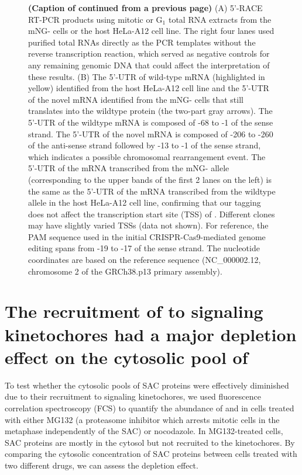 \begin{figure}
    \noindent\justifying \textbf{(Caption of  continued from a previous page)} (A) 5'-RACE RT-PCR products using mitotic or G$_1$ total RNA extracts from  the mNG- cells or the host HeLa-A12 cell line. The right four lanes used purified total RNAs directly as the PCR templates without the reverse transcription reaction, which served as negative controls for any remaining genomic DNA that could affect the interpretation of these results. (B) The 5'-UTR of wild-type  mRNA (highlighted in yellow) identified from the host HeLa-A12 cell line and the 5'-UTR of the novel  mRNA identified from the mNG- cells that still translates into the wildtype  protein (the two-part gray arrows). The 5'-UTR of the wildtype  mRNA is composed of -68 to -1 of the sense strand. The 5'-UTR of the novel  mRNA is composed of -206 to -260 of the anti-sense strand followed by -13 to -1 of the sense strand, which indicates a possible chromosomal rearrangement event. The 5'-UTR of the mRNA transcribed from the mNG- allele (corresponding to the upper bands of the first 2 lanes on the left) is the same as the 5'-UTR of the mRNA transcribed from the wildtype  allele in the host HeLa-A12 cell line, confirming that our  tagging does not affect the transcription start site (TSS) of . Different clones may have slightly varied TSSs (data not shown). For reference, the PAM sequence used in the initial CRISPR-Cas9-mediated genome editing spans from -19 to -17 of the sense strand. The nucleotide coordinates are based on the reference sequence (NC\_000002.12, chromosome 2 of the GRCh38.p13 primary assembly).
\end{figure}

\section{The recruitment of  to signaling kinetochores had a major depletion effect on the cytosolic pool of }

To test whether the cytosolic pools of SAC proteins were effectively diminished due to their recruitment to signaling kinetochores, we used fluorescence correlation spectroscopy (FCS) to quantify the abundance of  and  in cells treated with either MG132 (a proteasome inhibitor which arrests mitotic cells in the metaphase independently of the SAC) or nocodazole. In MG132-treated cells, SAC proteins are mostly in the cytosol but not recruited to the kinetochores. By comparing the cytosolic concentration of SAC proteins between cells treated with two different drugs, we can assess the depletion effect.

